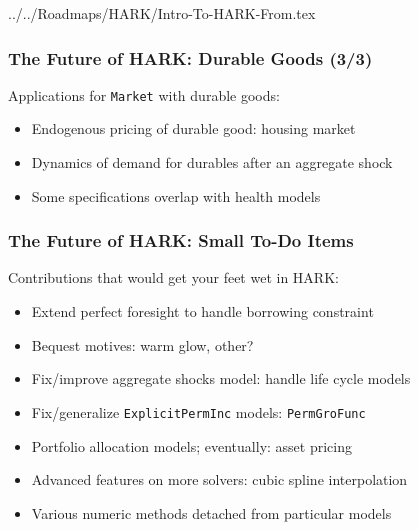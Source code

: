 \documentclass[11ptt]{beamer}
\newcommand{\bi}{\begin{itemize}}
\newcommand{\ei}{\end{itemize}}
\begin{document}
\begin{verbatimwrite}{../../Roadmaps/HARK/Intro-To-HARK-From.tex}


\begin{frame}
\frametitle{The Future of HARK: Durable Goods (3/3)}
Applications for \texttt{Market} with durable goods:
\bi
\item Endogenous pricing of durable good: housing market

\item Dynamics of demand for durables after an aggregate shock

\item Some specifications overlap with health models
\ei

\hyperlink{DiscussionTopics}{}
\end{frame}



\begin{frame}\label{StructuralChanges}
\frametitle{The Future of HARK: Small To-Do Items}
Contributions that would get your feet wet in HARK:
\bi
\item <1->Extend perfect foresight to handle borrowing constraint

\item <1->Bequest motives: warm glow, other?

\item <2->Fix/improve aggregate shocks model: handle life cycle models

\item <2->Fix/generalize \texttt{ExplicitPermInc} models: \texttt{PermGroFunc}

\item <2->Portfolio allocation models; eventually: asset pricing

\item <3->Advanced features on more solvers: cubic spline interpolation

\item <3->Various numeric methods detached from particular models
\ei
\end{frame}


\end{verbatimwrite}
\end{document}
